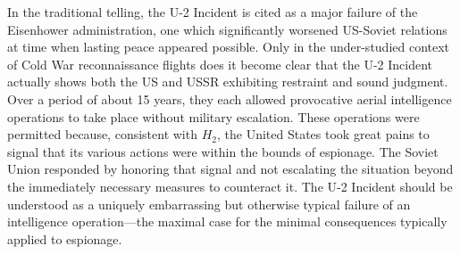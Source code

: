 \documentclass[12pt]{extarticle}
\begin{document}
In the traditional telling, the U-2 Incident is cited as a major failure of the Eisenhower administration, one which significantly worsened US-Soviet relations at time when lasting peace appeared possible. Only in the under-studied context of Cold War reconnaissance flights does it become clear that the U-2 Incident actually shows both the US and USSR exhibiting restraint and sound judgment. Over a period of about 15 years, they each allowed provocative aerial intelligence operations to take place without military escalation. These operations were permitted because, consistent with $H_2$, the United States took great pains to signal that its various actions were within the bounds of espionage. The Soviet Union responded by honoring that signal and not escalating the situation beyond the immediately necessary measures to counteract it. The U-2 Incident should be understood as a uniquely embarrassing but otherwise typical failure of an intelligence operation---the maximal case for the minimal consequences typically applied to espionage.


\end{document}
